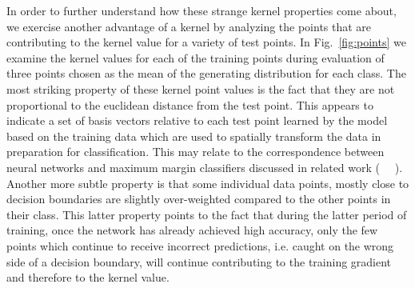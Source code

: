 In order to further understand how these strange kernel properties come about, we exercise another advantage of a kernel by analyzing the points that are contributing to the kernel value for a variety of test points. 
In Fig.~\ref{fig:points} we examine the kernel values for each of the training points during evaluation of three points chosen as the mean of the generating distribution for each class. 
The most striking property of these kernel point values is the fact that they are not proportional to the euclidean distance from the test point.
This appears to indicate a set of basis vectors relative to each test point learned by the model based on the training data which are used to spatially transform the data in preparation for classification. This may relate to the correspondence between neural networks and maximum margin classifiers discussed in related work (~\cite{chizat2020maxmargin} ~\cite{shah2021input}). 
Another more subtle property is that some individual data points, mostly close to decision boundaries are slightly over-weighted compared to the other points in their class. 
This latter property points to the fact that during the latter period of training, once the network has already achieved high accuracy, only the few points which continue to receive incorrect predictions, i.e. caught on the wrong side of a decision boundary, will continue contributing to the training gradient and therefore to the kernel value.

